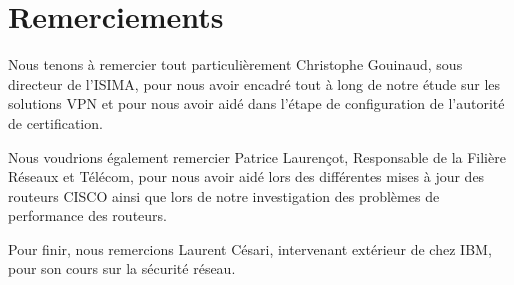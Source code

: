 \section*{Remerciements}

Nous tenons à remercier tout particulièrement Christophe Gouinaud, sous directeur de l'ISIMA, pour nous avoir encadré tout à long de notre étude sur les solutions VPN et pour nous avoir aidé dans l'étape de configuration de l'autorité de certification.

Nous voudrions également remercier Patrice Laurençot, Responsable de la Filière Réseaux et Télécom, pour nous avoir aidé lors des différentes mises à jour des routeurs CISCO ainsi que lors de notre investigation des problèmes de performance des routeurs.

Pour finir, nous remercions Laurent Césari, intervenant extérieur de chez IBM, pour son cours sur la sécurité réseau.

\pagebreak

